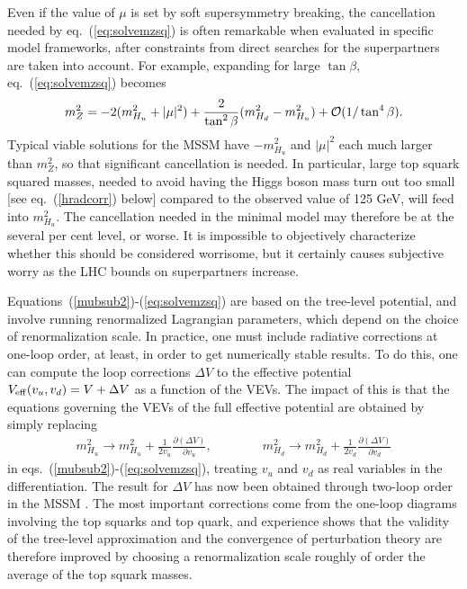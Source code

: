\documentclass[12pt]{article}
\def\beq{\begin{eqnarray}}
\def\eeq{\end{eqnarray}}
\begin{document}
Even if the value of $\mu$ is set by soft supersymmetry breaking, the 
cancellation needed by eq.~(\ref{eq:solvemzsq}) is often remarkable when 
evaluated in specific model frameworks, after constraints from direct 
searches for the superpartners are taken into account. 
For example, expanding for large $\tan\beta$, eq.~(\ref{eq:solvemzsq}) 
becomes
\beq
m_Z^2 = -2 (m^2_{H_u} + |\mu|^2) 
+ \frac{2}{\tan^2\beta} (m^2_{H_d} - m^2_{H_u})
+ {\cal O}(1/\tan^4\beta).
\eeq
Typical viable solutions for the MSSM have $-m^2_{H_u}$ and $|\mu|^2$ each 
much larger than $m_Z^2$, so that significant cancellation is needed. In 
particular, large top squark squared masses, needed to avoid having the 
Higgs boson mass turn out too small [see eq.~(\ref{hradcorr}) below] 
compared to the observed value of 125 GeV, will feed into $m^2_{H_u}$. 
The cancellation needed in the minimal model may therefore be at the 
several per cent level, or worse. It is impossible to objectively characterize 
whether this should be considered worrisome, but it certainly causes
subjective worry as the LHC bounds on superpartners increase.

Equations~(\ref{mubsub2})-(\ref{eq:solvemzsq}) 
are based on the tree-level potential, and involve 
running renormalized Lagrangian parameters, which depend on the choice of 
renormalization scale. In practice, one must include radiative corrections 
at one-loop order, at least, in order to get numerically stable results. 
To do this, one can compute the loop corrections $\Delta V$ to the 
effective potential $V_{\rm eff}(v_u, v_d) = V + \Delta V$ as a function 
of the VEVs. The impact of this is that the equations governing the VEVs 
of the full effective potential are obtained by simply replacing
\beq
m^2_{H_u} \rightarrow m^2_{H_u} + \frac{1}{2 v_u} 
\frac{\partial (\Delta V)}{\partial v_u},\qquad\qquad
m^2_{H_d} \rightarrow m^2_{H_d} + \frac{1}{2 v_d} 
\frac{\partial (\Delta V)}{\partial v_d}
\label{eq:Vradcor}
\eeq
in eqs.~(\ref{mubsub2})-(\ref{eq:solvemzsq}), treating $v_u$ and $v_d$ 
as real variables in the differentiation. 
The result for $\Delta V$ has now been obtained through two-loop 
order in the MSSM \cite{twoloopEP,twoloopEPMSSM}. The most important 
corrections come from 
the one-loop diagrams involving the top squarks and top quark, and 
experience shows that the validity of the tree-level approximation and 
the convergence of perturbation theory are therefore improved by choosing 
a renormalization scale roughly of order the average of the top squark masses.
\end{document}
